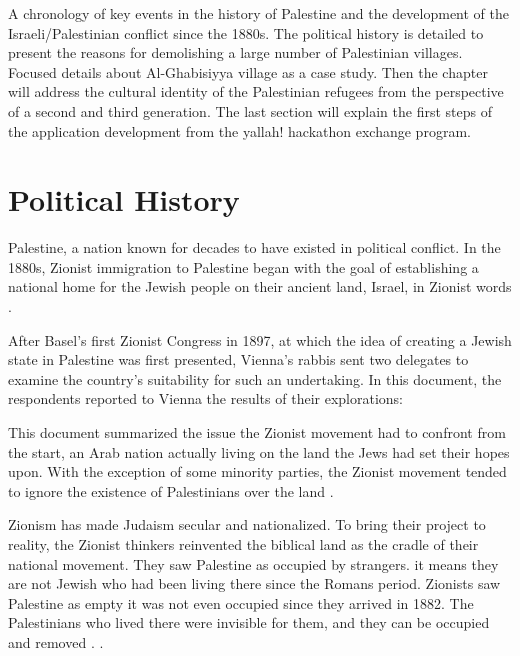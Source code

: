A chronology of key events in the history of Palestine and the development of the Israeli/Palestinian conflict since the 1880s. The political history is detailed to present the reasons for demolishing a large number of Palestinian villages. Focused details about Al-Ghabisiyya village as a case study. Then the chapter will address the cultural identity of the Palestinian refugees from the perspective of a second and third generation. The last section will explain the first steps of the application development from the \acrshort{yallah!} hackathon exchange program.  
\section{Political History}

Palestine, a nation known for decades to have existed in political conflict. In the 1880s, Zionist immigration to Palestine began with the goal of establishing a national home for the Jewish people on their ancient land, Israel, in Zionist words \citep{Morris2004, Pappe2006, Khalidi2015}.

After Basel's first Zionist Congress in 1897, at which the idea of creating a Jewish state in Palestine was first presented, Vienna's rabbis sent two delegates to examine the country's suitability for such an undertaking. 
In this document, the respondents reported to Vienna the results of their explorations:





\centerline{\textit{}}


This document summarized the issue the Zionist movement had to confront from the start, an Arab nation actually living on the land the Jews had set their hopes upon. With the exception of some minority parties, the Zionist movement tended to ignore the existence of Palestinians over the land \citep{Shlaim2014, Karmi2007}.

Zionism has made Judaism secular and nationalized. To bring their project to reality, the Zionist thinkers reinvented the biblical land as the cradle of their national movement. They saw Palestine as occupied by strangers.  it means they are not Jewish who had been living there since the Romans period. Zionists saw Palestine as empty it was not even occupied since they arrived in 1882. The Palestinians who lived there were invisible for them, and they can be occupied and removed \citep{Pappe2006}.  \cite[p.11]{Pappe2006}.


